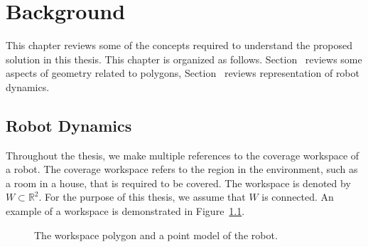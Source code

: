 \documentclass[../main.tex]{subfiles}
\begin{document}
\chapter{Background}
\label{chapter:background}

This chapter reviews some of the concepts required to understand the proposed solution in this thesis. This chapter is organized as follows. Section~ reviews some aspects of geometry related to polygons, Section~ reviews representation of robot dynamics. 

\section{Robot Dynamics}
\label{section:background_robot_dynamics}

Throughout the thesis, we make multiple references to the coverage workspace of a robot. The coverage workspace refers to the region in the environment, such as a room in a house, that is required to be covered. The workspace is denoted by $W\subset\mathbb{R}^2$. For the purpose of this thesis, we assume that $W$ is connected. An example of a workspace is demonstrated in Figure~\ref{fig:workspace_and_system}.

\begin{figure}
	\centering
	
	\caption{The workspace polygon and a point model of the robot.}
	\label{fig:workspace_and_system}
\end{figure}



\end{document}
